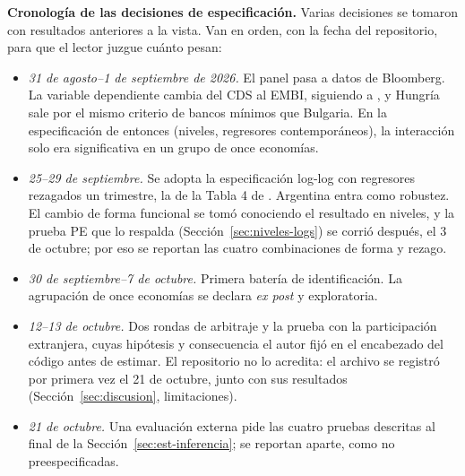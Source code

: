 \begin{mdframed}[linewidth=0.6pt,innertopmargin=6pt,innerbottommargin=6pt,innerleftmargin=8pt,innerrightmargin=8pt]
\small\textbf{Cronología de las decisiones de especificación.} Varias decisiones se tomaron con resultados anteriores a la vista. Van en orden, con la fecha del repositorio, para que el lector juzgue cuánto pesan:
\begin{itemize}\setlength\itemsep{1pt}
    \item \emph{31 de agosto--1 de septiembre de 2026.} El panel pasa a datos de Bloomberg. La variable dependiente cambia del CDS al EMBI, siguiendo a \citet{Chari2024b}, y Hungría sale por el mismo criterio de bancos mínimos que Bulgaria. En la especificación de entonces (niveles, regresores contemporáneos), la interacción solo era significativa en un grupo de once economías.
    \item \emph{25--29 de septiembre.} Se adopta la especificación log-log con regresores rezagados un trimestre, la de la Tabla 4 de \citet{Chari2024b}. Argentina entra como robustez. El cambio de forma funcional se tomó conociendo el resultado en niveles, y la prueba PE que lo respalda (Sección~\ref{sec:niveles-logs}) se corrió después, el 3 de octubre; por eso se reportan las cuatro combinaciones de forma y rezago.
    \item \emph{30 de septiembre--7 de octubre.} Primera batería de identificación. La agrupación de once economías se declara \emph{ex post} y exploratoria.
    \item \emph{12--13 de octubre.} Dos rondas de arbitraje y la prueba con la participación extranjera, cuyas hipótesis y consecuencia el autor fijó en el encabezado del código antes de estimar. El repositorio no lo acredita: el archivo se registró por primera vez el 21 de octubre, junto con sus resultados (Sección~\ref{sec:discusion}, limitaciones).
    \item \emph{21 de octubre.} Una evaluación externa pide las cuatro pruebas descritas al final de la Sección~\ref{sec:est-inferencia}; se reportan aparte, como no preespecificadas.
\end{itemize}
\end{mdframed}
